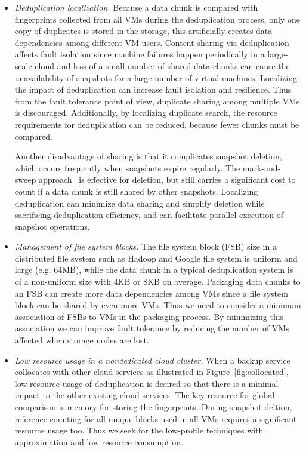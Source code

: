\begin{itemize}
\item {\em Deduplication localization.}
Because a data chunk is compared with fingerprints collected from all VMs during
the deduplication process, only one copy of duplicates is stored in the storage,
this artificially creates data dependencies among different VM users. 
Content sharing via deduplication affects fault isolation since machine failures happen periodically 
in a large-scale cloud and
loss of a small number of shared data chunks can 
cause the unavailability of snapshots for a large number of virtual machines.
Localizing the impact of deduplication can increase fault isolation and resilience.
Thus from the fault tolerance point of view,  duplicate sharing among multiple VMs is 
discouraged. Additionally, by localizing duplicate search, the resource requirements
for deduplication can be reduced, because fewer chunks must be compared.
 
Another disadvantage of sharing is that it complicates snapshot deletion, 
which  occurs frequently when snapshots expire regularly. 
The mark-and-sweep approach~\cite{Guo2011,Fabiano2013}  is effective for deletion, but still carries a significant cost
to count if a data chunk is still shared by other snapshots. 
Localizing deduplication can  minimize data sharing and simplify deletion while sacrificing 
deduplication efficiency, and  can facilitate parallel execution of snapshot operations.
\item{\em  Management of file system blocks.}
The file system block (FSB) size in a distributed file system such as  Hadoop and Google file system
 is uniform and large (e.g.  64MB),
while the data chunk in a typical deduplication system is of a non-uniform size with 4KB or 8KB on average.
Packaging data chunks to an FSB can create more data dependencies among VMs
since a file system block can be shared by even more VMs.
Thus we need to consider a minimum association of FSBs to VMs in the packaging
process. By minimizing this association we can improve fault tolerance by
reducing the number of VMs affected when storage nodes are lost.
 

\item {\em Low resource usage in a nondedicated cloud cluster.}
When a backup service collocates with other cloud services as illustrated in Figure~\ref{fig:collocated},
low resource usage of deduplication is desired so that
there is  a minimal impact to the other existing cloud services.
The key resource for global comparison  is memory for storing the fingerprints.
During snapshot deltion, reference counting for all unique blocks used in all VMs requires a significant resource usage
too.  Thus we seek for the low-profile techniques with approximation and low resource consumption. 
\end{itemize}

